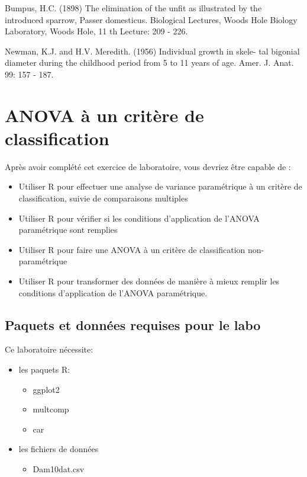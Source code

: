 \documentclass[12pt,]{book}
\providecommand{\tightlist}{%
  \setlength{\itemsep}{0pt}\setlength{\parskip}{0pt}}
\begin{document}
Bumpus, H.C. (1898) The elimination of the unfit as illustrated by the introduced sparrow, Passer domesticus. Biological Lectures, Woods Hole Biology Laboratory, Woods Hole, 11 th Lecture: 209 - 226.

Newman, K.J. and H.V. Meredith. (1956) Individual growth in skele- tal bigonial diameter during the childhood period from 5 to 11 years of age. Amer. J. Anat. 99: 157 - 187.

\hypertarget{anova-uxe0-un-crituxe8re-de-classification}{%
\chapter{ANOVA à un critère de classification}\label{anova-uxe0-un-crituxe8re-de-classification}}

Après avoir complété cet exercice de laboratoire, vous devriez être capable de :

\begin{itemize}
\tightlist
\item
  Utiliser R pour effectuer une analyse de variance paramétrique à un critère de classification, suivie de comparaisons multiples
\item
  Utiliser R pour vérifier si les conditions d'application de l'ANOVA paramétrique sont remplies
\item
  Utiliser R pour faire une ANOVA à un critère de classification non-paramétrique
\item
  Utiliser R pour transformer des données de manière à mieux remplir les conditions d'application de l'ANOVA paramétrique.
\end{itemize}

\hypertarget{set-ano}{%
\section{Paquets et données requises pour le labo}\label{set-ano}}

Ce laboratoire nécessite:

\begin{itemize}
\tightlist
\item
  les paquets R:

  \begin{itemize}
  \tightlist
  \item
    ggplot2
  \item
    multcomp
  \item
    car
  \end{itemize}
\item
  les fichiers de données

  \begin{itemize}
  \tightlist
  \item
    Dam10dat.csv
  \end{itemize}
\end{itemize}
\end{document}
